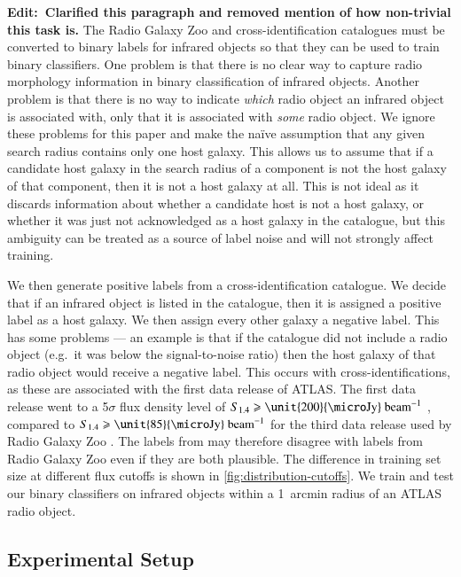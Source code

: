 \documentclass[fleqn,usenatbib,usedcolumn]{mnras}
\newcommand{\jansky}{\text{Jy}}
\newcommand{\edit}[1]{{\bf Edit:~{#1}}}
\begin{document}
    \edit{Clarified this paragraph and removed mention of how non-trivial this task is.} The Radio Galaxy Zoo and \citet{norris06} cross-identification catalogues must be converted to binary labels for infrared objects so that they can be used to train binary classifiers. One problem is that there is no clear way to capture radio morphology information in binary classification of infrared objects. Another problem is that there is no way to indicate \emph{which} radio object an infrared object is associated with, only that it is associated with \emph{some} radio object. We ignore these problems for this paper and make the na\"ive assumption that any given search radius contains only one host galaxy. This allows us to assume that if a candidate host galaxy in the search radius of a component is not the host galaxy of that component, then it is not a host galaxy at all. This is not ideal as it discards information about whether a candidate host is not a host galaxy, or whether it was just not acknowledged as a host galaxy in the catalogue, but this ambiguity can be treated as a source of label noise and will not strongly affect training.

    We then generate positive labels from a cross-identification catalogue.
    We decide that if an infrared object is listed in the catalogue, then it
    is assigned a positive label as a host galaxy. We then assign every other galaxy a negative label. This has some problems
    --- an example is that if the catalogue did not include a radio
    object (e.g.~it was below the signal-to-noise ratio) then the host galaxy
    of that radio object would receive a negative label. This occurs with
    \citet{norris06} cross-identifications, as these are associated with the
    first data release of ATLAS. The first data release went to a 5$\sigma$
    flux density level of $S_{1.4} \geq \unit{200}{\micro\jansky}\text{
    beam}^{-1}$ \citep{norris06}, compared to $S_{1.4} \geq \unit{85}{\micro\jansky}\text{
    beam}^{-1}$ for the third data release used by Radio Galaxy Zoo
    \citep{franzen15}. The labels from \citet{norris06} may therefore disagree with labels
    from Radio Galaxy Zoo even if they are both plausible. The difference in
    training set size at different flux cutoffs is shown in
    \autoref{fig:distribution-cutoffs}. We train and test our binary classifiers on infrared objects within a 1~arcmin radius of an ATLAS radio object.

  \subsection{Experimental Setup}
  \label{sec:experimental-setup}
\end{document}
